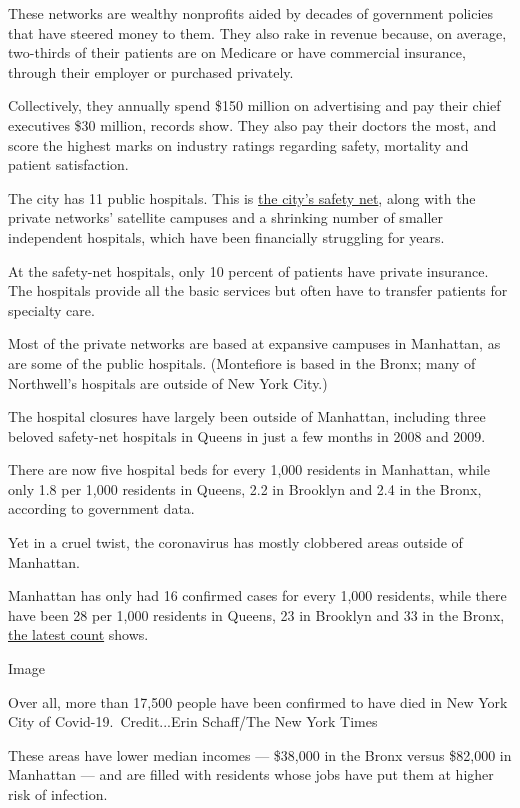 These networks are wealthy nonprofits aided by decades of government
policies that have steered money to them. They also rake in revenue
because, on average, two-thirds of their patients are on Medicare or
have commercial insurance, through their employer or purchased
privately.

Collectively, they annually spend \$150 million on advertising and pay
their chief executives \$30 million, records show. They also pay their
doctors the most, and score the highest marks on industry ratings
regarding safety, mortality and patient satisfaction.

The city has 11 public hospitals. This is
\href{https://www.nytimes3xbfgragh.onion/2020/04/26/nyregion/coronavirus-new-york-university-hospital.html}{the
city's safety net}, along with the private networks' satellite campuses
and a shrinking number of smaller independent hospitals, which have been
financially struggling for years.

At the safety-net hospitals, only 10 percent of patients have private
insurance. The hospitals provide all the basic services but often have
to transfer patients for specialty care.

Most of the private networks are based at expansive campuses in
Manhattan, as are some of the public hospitals. (Montefiore is based in
the Bronx; many of Northwell's hospitals are outside of New York City.)

The hospital closures have largely been outside of Manhattan, including
three beloved safety-net hospitals in Queens in just a few months in
2008 and 2009.

There are now five hospital beds for every 1,000 residents in Manhattan,
while only 1.8 per 1,000 residents in Queens, 2.2 in Brooklyn and 2.4 in
the Bronx, according to government data.

Yet in a cruel twist, the coronavirus has mostly clobbered areas outside
of Manhattan.

Manhattan has only had 16 confirmed cases for every 1,000 residents,
while there have been 28 per 1,000 residents in Queens, 23 in Brooklyn
and 33 in the Bronx,
\href{https://www1.nyc.gov/site/doh/covid/covid-19-data.page}{the latest
count} shows.

Image

Over all, more than 17,500 people have been confirmed to have died in
New York City of Covid-19.~Credit...Erin Schaff/The New York Times

These areas have lower median incomes --- \$38,000 in the Bronx versus
\$82,000 in Manhattan --- and are filled with residents whose jobs have
put them at higher risk of infection.

